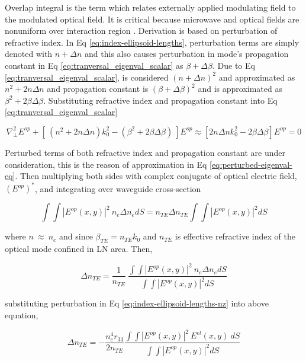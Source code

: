 \documentclass[thesis]{deutez}
\begin{document}
    Overlap integral is the term which relates externally applied modulating field to the modulated optical field. It is critical because microwave and optical fields are nonuniform over interaction region \cite{16}. Derivation is based on perturbation of refractive index. In Eq \ref{eq:index-ellipsoid-lengths}, perturbation terms are simply denoted with $n+\Delta n$ and this also causes perturbation in mode's propagation constant in Eq \ref{eq:tranversal_eigenval_scalar} as $\beta + \Delta \beta$. Due to Eq \ref{eq:tranversal_eigenval_scalar}, is considered $(n+\Delta n)^2$ and approximated as $n^2+2n\Delta n$ and propagation constant is $(\beta+\Delta\beta)^2$ and is approximated as $\beta^2+2\beta\Delta\beta$. Substituting refractive index and  propagation constant into Eq \ref{eq:tranversal_eigenval_scalar} 


    \begin{equation}
        \nabla^2_{\perp} E^{op}+\left[ \:(n^2+2n\Delta n)k_0^2 - (\beta^2+2\beta\Delta\beta)  \:
    \right] E^{op} \approx \left[ 2n\Delta nk_0^2 - 2\beta\Delta\beta \right] E^{op} = 0
    \label{eq:perturbed-eigenval-eq}
    \end{equation}

    Perturbed terms of both refractive index and propagation constant are under consideration, this is the reason of approximation in Eq \ref{eq:perturbed-eigenval-eq}. Then multiplying both sides with complex conjugate of optical electric field, $(E^{op})^*$, and integrating over waveguide cross-section

    \begin{equation}
        \int \int |E^{op}(x,y)|^2 \: n_e\Delta n_edS = n_{TE}\Delta n_{TE}\int \int |E^{op}(x,y)|^2 dS
        \label{eq:overlap-der1}
    \end{equation}
    
    where $n \: \approx \: n_e$ and since $\beta_{TE} = n_{TE}k_0 $ and $n_{TE}$ is effective refractive index of the optical mode confined in LN area. Then,

    \begin{equation}
        \Delta n_{TE} =\frac{1}{n_{TE}} \: \frac{ \int\int |E^{op}(x,y)|^2 \: n_e\Delta n_edS}{\int\int |E^{op}(x,y)|^2 dS}
        \label{eq:overlap-der2}
    \end{equation}

    substituting perturbation in Eq \ref{eq:index-ellipsoid-lengths-nz} into above equation,

    \begin{equation}
        \Delta n_{TE} = -\frac{n_e^4r_{33}}{2n_{TE}}\frac{\int\int |E^{op}(x,y)|^2 \: E^{el}(x,y)\: dS}{\int\int |E^{op}(x,y)|^2 dS}
        \label{eq:overlap-der3}
    \end{equation}
\end{document}

